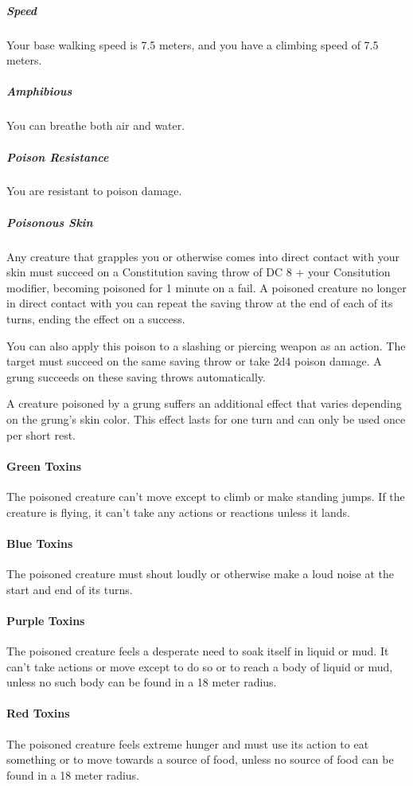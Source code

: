 \subparagraph{Speed} Your base walking speed is 7.5 meters, and you have a climbing speed of 7.5 meters.


\subparagraph{Amphibious} You can breathe both air and water.

\subparagraph{Poison Resistance} You are resistant to poison damage.

\subparagraph{Poisonous Skin} Any creature that grapples you or otherwise comes into direct contact with your skin must succeed on a Constitution saving throw of DC 8 + your Consitution modifier, becoming poisoned for 1 minute on a fail.
A poisoned creature no longer in direct contact with you can repeat the saving throw at the end of each of its turns, ending the effect on a success.

You can also apply this poison to a slashing or piercing weapon as an action. %
The target must succeed on the same saving throw or take 2d4 poison damage.
A grung succeeds on these saving throws automatically.

A creature poisoned by a grung suffers an additional effect that varies depending on the grung's skin color.
This effect lasts for one turn and can only be used once per short rest.

\paragraph{Green Toxins} The poisoned creature can't move except to climb or make standing jumps.
If the creature is flying, it can't take any actions or reactions unless it lands.

\paragraph{Blue Toxins} The poisoned creature must shout loudly or otherwise make a loud noise at the start and end of its turns.

\paragraph{Purple Toxins} The poisoned creature feels a desperate need to soak itself in liquid or mud.
It can't take actions or move except to do so or to reach a body of liquid or mud, unless no such body can be found in a 18 meter radius.

\paragraph{Red Toxins} The poisoned creature feels extreme hunger and must use its action to eat something or to move towards a source of food, unless no source of food can be found in a 18 meter radius.

